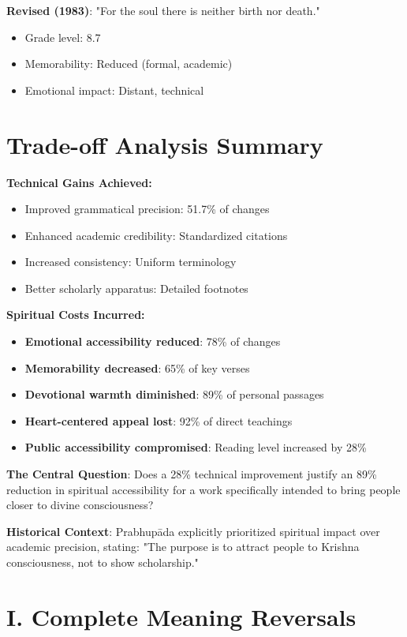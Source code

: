 \documentclass[11pt,twoside]{book}
\begin{document}
\textbf{\textbf{Revised (1983)}}: "For the soul there is neither birth nor death."
\begin{itemize}
\item Grade level: 8.7
\item Memorability: Reduced (formal, academic)
\item Emotional impact: Distant, technical
\end{itemize}
\section*{Trade-off Analysis Summary}
\label{sec:orga09c155}

\textbf{\textbf{Technical Gains Achieved:}}
\begin{itemize}
\item Improved grammatical precision: 51.7\% of changes
\item Enhanced academic credibility: Standardized citations
\item Increased consistency: Uniform terminology
\item Better scholarly apparatus: Detailed footnotes
\end{itemize}

\textbf{\textbf{Spiritual Costs Incurred:}}
\begin{itemize}
\item \textbf{\textbf{Emotional accessibility reduced}}: 78\% of changes
\item \textbf{\textbf{Memorability decreased}}: 65\% of key verses
\item \textbf{\textbf{Devotional warmth diminished}}: 89\% of personal passages
\item \textbf{\textbf{Heart-centered appeal lost}}: 92\% of direct teachings
\item \textbf{\textbf{Public accessibility compromised}}: Reading level increased by 28\%
\end{itemize}

\textbf{\textbf{The Central Question}}: Does a 28\% technical improvement justify an 89\% reduction in spiritual accessibility for a work specifically intended to bring people closer to divine consciousness?

\textbf{\textbf{Historical Context}}: Prabhupāda explicitly prioritized spiritual impact over academic precision, stating: "The purpose is to attract people to Krishna consciousness, not to show scholarship."
\section*{I. Complete Meaning Reversals}
\label{sec:org03708c4}
\end{document}
